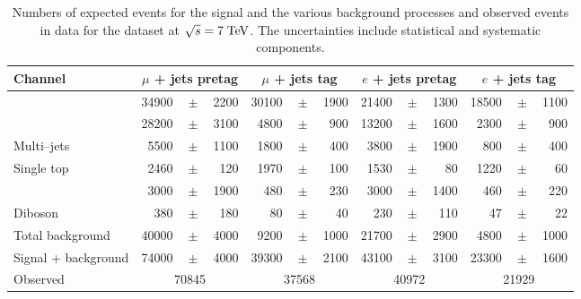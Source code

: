 \begin{table}
  \caption[Event yields for the samples at $\sqrt{s} = 7 \TeV{}$]{
    Numbers of expected events for the \ttbar{} signal and the various background 
    processes and observed events in data for the dataset 
    at $\sqrt{s} = 7 \TeV{}$.
    The uncertainties include statistical and systematic components.}
  \label{tab:yields2011}
  \centering
  \begin{tabular}{ l  rrr  rrr  rrr  rrr }
    \toprule
    Channel & \multicolumn{3}{c}{$\mu$ + jets pretag} & \multicolumn{3}{c}{$\mu$ + jets tag} & \multicolumn{3}{c}{$e$ + jets pretag} & \multicolumn{3}{c}{$e$ + jets tag} \\ 
    \midrule
    \ttbar{}         & 34900 &$\!\!\!\pm\!\!\!$& 2200  & 30100 &$\!\!\!\pm\!\!\!$& 1900  & 21400 &$\!\!\!\pm\!\!\!$& 1300  & 18500 &$\!\!\!\pm\!\!\!$& 1100  \\ %
    \wjets{}         & 28200 &$\!\!\!\pm\!\!\!$& 3100  & 4800  &$\!\!\!\pm\!\!\!$& 900   & 13200 &$\!\!\!\pm\!\!\!$& 1600  & 2300  &$\!\!\!\pm\!\!\!$& 900  \\
    Multi--jets      & 5500  &$\!\!\!\pm\!\!\!$& 1100  & 1800  &$\!\!\!\pm\!\!\!$& 400   & 3800  &$\!\!\!\pm\!\!\!$& 1900  & 800   &$\!\!\!\pm\!\!\!$& 400  \\ 
    Single top       & 2460  &$\!\!\!\pm\!\!\!$& 120   & 1970  &$\!\!\!\pm\!\!\!$& 100   & 1530  &$\!\!\!\pm\!\!\!$& 80    & 1220  &$\!\!\!\pm\!\!\!$& 60   \\ 
    \zjets{}         & 3000  &$\!\!\!\pm\!\!\!$& 1900  & 480   &$\!\!\!\pm\!\!\!$& 230   & 3000  &$\!\!\!\pm\!\!\!$& 1400  & 460   &$\!\!\!\pm\!\!\!$& 220   \\
    Diboson          & 380   &$\!\!\!\pm\!\!\!$& 180   & 80    &$\!\!\!\pm\!\!\!$& 40    & 230   &$\!\!\!\pm\!\!\!$& 110   & 47    &$\!\!\!\pm\!\!\!$& 22   \\ 
    Total background & 40000 &$\!\!\!\pm\!\!\!$& 4000  & 9200  &$\!\!\!\pm\!\!\!$& 1000  & 21700 &$\!\!\!\pm\!\!\!$& 2900  & 4800  &$\!\!\!\pm\!\!\!$& 1000  \\ 
    Signal + background     & 74000 &$\!\!\!\pm\!\!\!$ & 4000 & 39300 &$\!\!\!\pm\!\!\!$& 2100  & 43100 &$\!\!\!\pm\!\!\!$& 3100 & 23300 &$\!\!\!\pm\!\!\!$& 1600  \\ \hline
    Observed                & \multicolumn{3}{c}{70845}  & \multicolumn{3}{c}{37568} & \multicolumn{3}{c}{40972}      & \multicolumn{3}{c}{21929} \\
    \bottomrule
  \end{tabular}
\end{table}


